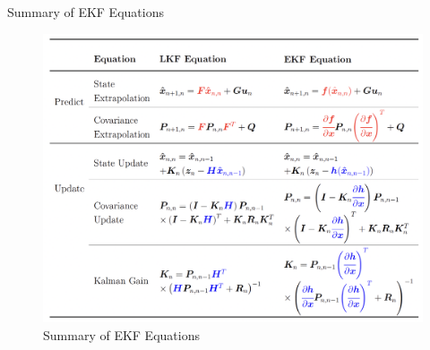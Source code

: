 \begin{frame}{Summary of EKF Equations}
\begin{figure}
    \centering
    \includegraphics[width=0.85\linewidth]{Figures//Part3/EKF_Eq_Summary.png}
    \caption{Summary of EKF Equations}
    \label{fig:Summary_EKF_Equations}
\end{figure}
\end{frame}

